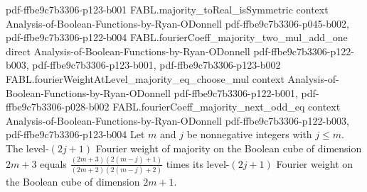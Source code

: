 \begin{theorem}
{    pdf-ffbe9c7b3306-p123-b001}
\proofstep
  {FABL.majority_toReal_isSymmetric}
  {context}
  {Analysis-of-Boolean-Functions-by-Ryan-ODonnell}
  {pdf-ffbe9c7b3306-p045-b002,
    pdf-ffbe9c7b3306-p122-b004}
\proofstep
  {FABL.fourierCoeff_majority_two_mul_add_one}
  {direct}
  {Analysis-of-Boolean-Functions-by-Ryan-ODonnell}
  {pdf-ffbe9c7b3306-p122-b003,
    pdf-ffbe9c7b3306-p123-b001,
    pdf-ffbe9c7b3306-p123-b002}
\proofstep
  {FABL.fourierWeightAtLevel_majority_eq_choose_mul}
  {context}
  {Analysis-of-Boolean-Functions-by-Ryan-ODonnell}
  {pdf-ffbe9c7b3306-p122-b001,
    pdf-ffbe9c7b3306-p028-b002}
\proofstep
  {FABL.fourierCoeff_majority_next_odd_eq}
  {context}
  {Analysis-of-Boolean-Functions-by-Ryan-ODonnell}
  {pdf-ffbe9c7b3306-p122-b003,
    pdf-ffbe9c7b3306-p123-b004}
Let $m$ and $j$ be nonnegative integers with $j\le m$. The level-$(2j+1)$ Fourier weight
of majority on the Boolean cube of dimension $2m+3$ equals
$\frac{(2m+3)(2(m-j)+1)}{(2m+2)(2(m-j)+2)}$ times its level-$(2j+1)$ Fourier weight on
the Boolean cube of dimension $2m+1$.
\end{theorem}


